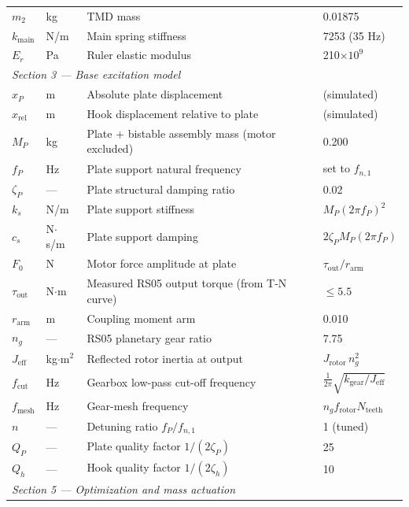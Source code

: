 \documentclass[11pt,letterpaper]{article}
\begin{document}
\begin{longtable}{p{2.1cm} p{1.5cm} p{6.7cm} p{3.1cm}}
$m_2$      & kg      & TMD mass                      & 0.01875 \\
$k_{\mathrm{main}}$ & N/m & Main spring stiffness   & 7253 (35 Hz) \\
$E_r$      & Pa      & Ruler elastic modulus         & 210$\times10^9$ \\
\midrule
\multicolumn{4}{l}{\textit{Section 3 — Base excitation model}} \\
$x_P$      & m       & Absolute plate displacement   & (simulated) \\
$x_{\mathrm{rel}}$ & m & Hook displacement relative to plate & (simulated) \\
$M_P$      & kg      & Plate + bistable assembly mass (motor excluded) & 0.200 \\
$f_P$      & Hz      & Plate support natural frequency & set to $f_{n,1}$ \\
$\zeta_P$  & ---     & Plate structural damping ratio & 0.02 \\
$k_s$      & N/m     & Plate support stiffness       & $M_P(2\pi f_P)^2$ \\
$c_s$      & N$\cdot$s/m & Plate support damping     & $2\zeta_P M_P(2\pi f_P)$ \\
$F_0$      & N       & Motor force amplitude at plate & $\tau_{\mathrm{out}}/r_{\mathrm{arm}}$ \\
$\tau_{\mathrm{out}}$ & N$\cdot$m & Measured RS05 output torque (from T-N curve) & $\leq 5.5$ \\
$r_{\mathrm{arm}}$ & m & Coupling moment arm          & 0.010 \\
$n_g$      & ---     & RS05 planetary gear ratio     & 7.75 \\
$J_{\mathrm{eff}}$ & kg$\cdot$m$^2$ & Reflected rotor inertia at output & $J_{\mathrm{rotor}}\,n_g^2$ \\
$f_{\mathrm{cut}}$ & Hz & Gearbox low-pass cut-off frequency & $\frac{1}{2\pi}\sqrt{k_{\mathrm{gear}}/J_{\mathrm{eff}}}$ \\
$f_{\mathrm{mesh}}$ & Hz & Gear-mesh frequency          & $n_g f_{\mathrm{rotor}} N_{\mathrm{teeth}}$ \\
$n$        & ---     & Detuning ratio $f_P/f_{n,1}$  & 1 (tuned) \\
$Q_P$      & ---     & Plate quality factor $1/(2\zeta_P)$ & 25 \\
$Q_h$      & ---     & Hook quality factor $1/(2\zeta_h)$ & 10 \\
\midrule
\multicolumn{4}{l}{\textit{Section 5 — Optimization and mass actuation}} \\

\end{longtable}
\end{document}
